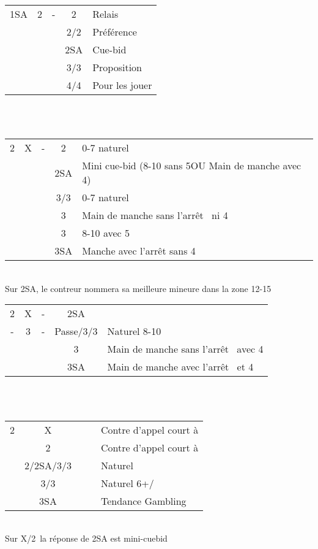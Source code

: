 \documentclass[a4paper, oneside, 11pt]{report}
\begin{document}
	\begin{tabular}{cccc|l}
	1SA & 2\trefle & - & 2\carreau & Relais\\
	&&& 2\coeur/2\pique & Préférence\\
	&&& 2SA & Cue-bid\\
	&&& 3\coeur/3\pique & Proposition\\
	&&& 4\coeur/4\pique & Pour les jouer\\
	\end{tabular}\\\\

	\begin{tabular}{cccc|l}
	2\coeur & X & - & 2\pique & 0-7 naturel\\
	&&& 2SA & Mini cue-bid (8-10 sans 5\pique OU Main de manche avec 4\pique)\\
	&&& 3\trefle/3\carreau & 0-7 naturel\\
	&&& 3\coeur & Main de manche sans l'arrêt \coeur\ ni 4\pique\\
	&&& 3\pique & 8-10 avec 5\pique\\
	&&& 3SA & Manche avec l'arrêt \coeur sans 4\pique\\
	\end{tabular}\\
	Sur 2SA,  le contreur nommera sa meilleure mineure dans la zone 12-15\\

	\begin{tabular}{cccc|l}
	2\coeur & X & - & 2SA &\\
	- & 3\trefle & - & Passe/3\carreau/3\pique & Naturel 8-10\\
	 &&& 3\coeur & Main de manche sans l'arrêt \coeur\ avec 4\pique\\
	 &&& 3SA & Main de manche avec l'arrêt \coeur\ et 4\pique\\
	\end{tabular}\\\\

	\begin{tabular}{cccc|l}
	2\carreau & X &&& Contre d'appel court à \pique\\
	& 2\coeur &&& Contre d'appel court à \coeur\\
	& 2\pique/2SA/3\trefle/3\carreau &&& Naturel\\
	& 3\coeur/3\pique &&& Naturel 6+\coeur/\pique\\
	& 3SA &&& Tendance Gambling\\
	\end{tabular}\\
	Sur X/2\coeur\ la réponse de 2SA est mini-cuebid\\
	
\end{document}
